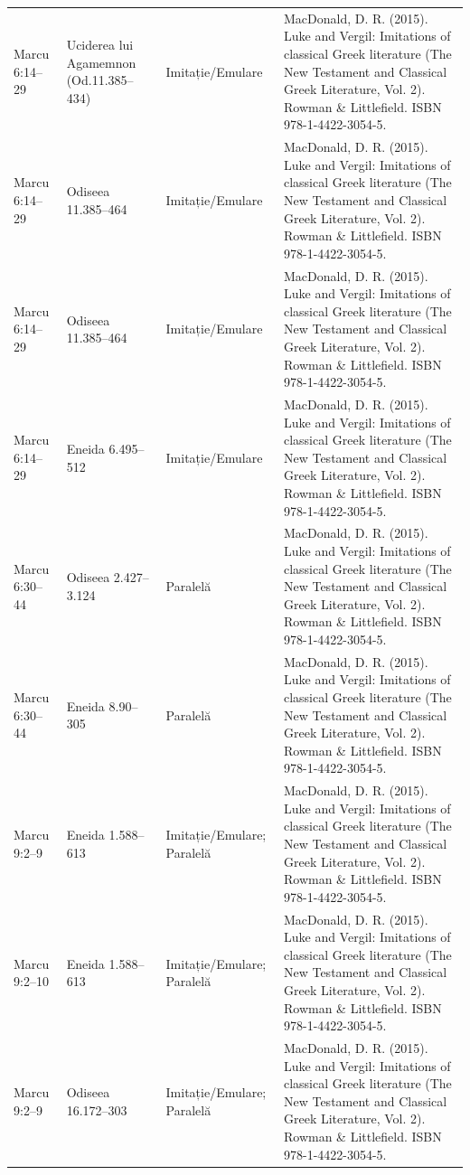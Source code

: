 \documentclass[12pt,a4paper,twoside,openany]{book}
\begin{document}
\begin{longtable}{L{1.4cm}L{1.7cm}L{3.1cm}L{8.4cm}}
Marcu 6:14–29 & Uciderea lui Agamemnon (Od.11.385–434) & Imitație/Emulare & MacDonald, D. R. (2015). Luke and Vergil: Imitations of classical Greek literature (The New Testament and Classical Greek Literature, Vol. 2). Rowman \& Littlefield. ISBN 978-1-4422-3054-5. \\
Marcu 6:14–29 & Odiseea 11.385–464 & Imitație/Emulare & MacDonald, D. R. (2015). Luke and Vergil: Imitations of classical Greek literature (The New Testament and Classical Greek Literature, Vol. 2). Rowman \& Littlefield. ISBN 978-1-4422-3054-5. \\
Marcu 6:14–29 & Odiseea 11.385–464 & Imitație/Emulare & MacDonald, D. R. (2015). Luke and Vergil: Imitations of classical Greek literature (The New Testament and Classical Greek Literature, Vol. 2). Rowman \& Littlefield. ISBN 978-1-4422-3054-5. \\
Marcu 6:14–29 & Eneida 6.495–512 & Imitație/Emulare & MacDonald, D. R. (2015). Luke and Vergil: Imitations of classical Greek literature (The New Testament and Classical Greek Literature, Vol. 2). Rowman \& Littlefield. ISBN 978-1-4422-3054-5. \\
Marcu 6:30–44 & Odiseea 2.427–3.124 & Paralelă & MacDonald, D. R. (2015). Luke and Vergil: Imitations of classical Greek literature (The New Testament and Classical Greek Literature, Vol. 2). Rowman \& Littlefield. ISBN 978-1-4422-3054-5. \\
Marcu 6:30–44 & Eneida 8.90–305 & Paralelă & MacDonald, D. R. (2015). Luke and Vergil: Imitations of classical Greek literature (The New Testament and Classical Greek Literature, Vol. 2). Rowman \& Littlefield. ISBN 978-1-4422-3054-5. \\
Marcu 9:2–9 & Eneida 1.588–613 & Imitație/Emulare; Paralelă & MacDonald, D. R. (2015). Luke and Vergil: Imitations of classical Greek literature (The New Testament and Classical Greek Literature, Vol. 2). Rowman \& Littlefield. ISBN 978-1-4422-3054-5. \\
Marcu 9:2–10 & Eneida 1.588–613 & Imitație/Emulare; Paralelă & MacDonald, D. R. (2015). Luke and Vergil: Imitations of classical Greek literature (The New Testament and Classical Greek Literature, Vol. 2). Rowman \& Littlefield. ISBN 978-1-4422-3054-5. \\
Marcu 9:2–9 & Odiseea 16.172–303 & Imitație/Emulare; Paralelă & MacDonald, D. R. (2015). Luke and Vergil: Imitations of classical Greek literature (The New Testament and Classical Greek Literature, Vol. 2). Rowman \& Littlefield. ISBN 978-1-4422-3054-5. \\

\end{longtable}
\end{document}

